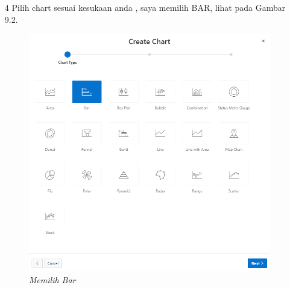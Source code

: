 \begin{itemize}
    \item[4]Pilih chart sesuai kesukaan anda , saya memilih BAR, lihat pada Gambar 9.2.
    \begin{figure}
        \centering
        \includegraphics[scale=0.5]{figures/chart/chart2.png}
        \caption{\textit{Memilih Bar}}
        \label{Pilih Bar}
    \end{figure}


\end{itemize}

